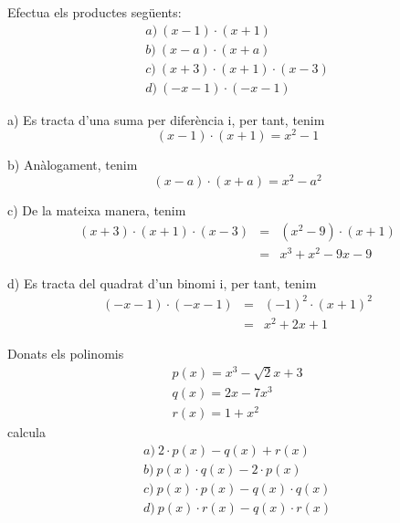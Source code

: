 \begin{exercici}
Efectua els productes següents:\[
\begin{array}{l}
a)~(x-1)\cdot (x+1) \\
b)~(x-a)\cdot (x+a) \\
c)~(x+3)\cdot (x+1)\cdot (x-3) \\
d)~(-x-1)\cdot (-x-1)\end{array}\]
\end{exercici}

\begin{solucio}
a) Es tracta d’una suma per diferència i, per tant, tenim\[
(x-1)\cdot (x+1)=x^{2}-1
\]

b) Anàlogament, tenim\[
(x-a)\cdot (x+a)=x^{2}-a^{2}
\]

c) De la mateixa manera, tenim\begin{eqnarray*}
(x+3)\cdot (x+1)\cdot (x-3) &=&(x^{2}-9)\cdot (x+1) \\
&=&x^{3}+x^{2}-9x-9
\end{eqnarray*}

d) Es tracta del quadrat d'un binomi i, per tant, tenim\begin{eqnarray*}
(-x-1)\cdot (-x-1) &=&(-1)^{2}\cdot (x+1)^{2} \\
&=&x^{2}+2x+1
\end{eqnarray*}
\end{solucio}

\begin{exercici}
Donats els polinomis\[
\begin{array}{l}
p(x)=x^{3}-\sqrt{2}x+3 \\
q(x)=2x-7x^{3} \\
r(x)=1+x^{2}\end{array}\]calcula\[
\begin{array}{l}
a)~2\cdot p(x)-q(x)+r(x) \\
b)~p(x)\cdot q(x)-2\cdot p(x) \\
c)~p(x)\cdot p(x)-q(x)\cdot q(x) \\
d)~p(x)\cdot r(x)-q(x)\cdot r(x)\end{array}\]
\end{exercici}

